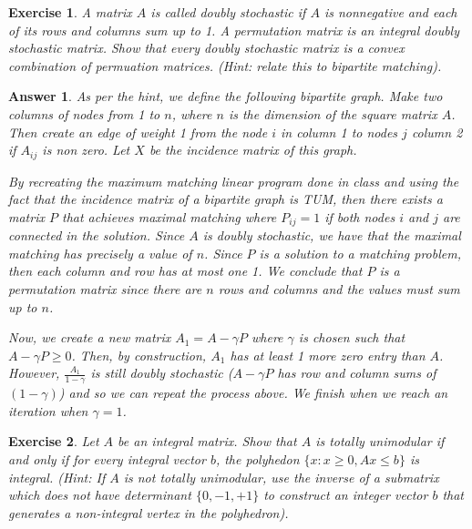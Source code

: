 \documentclass[12pt]{article}
\theoremstyle{colon}
\newtheorem{exercise}{Exercise}
\newtheorem*{answer}{Answer}
\begin{document}
\clearpage

\begin{exercise}
  A matrix $A$ is called \textit{doubly stochastic} if $A$ is nonnegative and each of its rows and columns sum up to 1. A \textit{permutation} matrix is an integral doubly stochastic matrix. Show that every doubly stochastic matrix is a convex combination of permuation matrices. (Hint: relate this to bipartite matching).
\end{exercise}

\begin{answer}
  As per the hint, we define the following bipartite graph. Make two columns of nodes from 1 to $n$, where $n$ is the dimension of the square matrix $A$. Then create an edge of weight 1 from the node $i$ in column 1 to nodes $j$ column 2 if $A_{ij}$ is non zero. Let $X$ be the incidence matrix of this graph.

  By recreating the maximum matching linear program done in class and using the fact that the incidence matrix of a bipartite graph is TUM, then there exists a matrix $P$ that achieves maximal matching where $P_{ij} = 1$ if both nodes $i$ and $j$ are connected in the solution. Since $A$ is doubly stochastic, we have that the maximal matching has precisely a value of $n$. Since $P$ is a solution to a matching problem, then each column and row has at most one 1. We conclude that $P$ is a permutation matrix since there are $n$ rows and columns and the values must sum up to $n$.

  Now, we create a new matrix $A_1 = A - \gamma P$ where $\gamma$ is chosen such that $A - \gamma P \geq 0$. Then, by construction, $A_1$ has at least 1 more zero entry than $A$. However, $\frac{A_1}{1-\gamma}$ is still doubly stochastic ($A - \gamma P$ has row and column sums of $(1-\gamma)$) and so we can repeat the process above. We finish when we reach an iteration when $\gamma = 1$.
\end{answer}

\clearpage

\begin{exercise}
  Let $A$ be an integral matrix. Show that $A$ is totally unimodular if and only if for every integral vector $b$, the polyhedon $\{ x : x \geq 0, Ax \leq b \}$ is integral. (Hint: If $A$ is not totally unimodular, use the inverse of a submatrix which does not have determinant $\{0, -1, +1\}$ to construct an integer vector $b$ that generates a non-integral vertex in the polyhedron).
\end{exercise}
\end{document}
